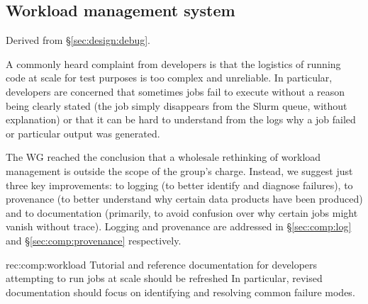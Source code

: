 \subsection{Workload management system}
\label{sec:comp:workload}

Derived from \S\ref{sec:design:debug}.

A commonly heard complaint from developers is that the logistics of running code at scale for test purposes is too complex and unreliable.
In particular, developers are concerned that sometimes jobs fail to execute without a reason being clearly stated (the job simply disappears from the Slurm queue, without explanation) or that it can be hard to understand from the logs why a job failed or particular output was generated.

The WG reached the conclusion that a wholesale rethinking of workload management is outside the scope of the group's charge.
Instead, we suggest just three key improvements: to logging (to better identify and diagnose failures), to provenance (to better understand why certain data products have been produced) and to documentation (primarily, to avoid confusion over why certain jobs might vanish without trace). Logging and provenance are addressed in \S\ref{sec:comp:log} and \S\ref{sec:comp:provenance} respectively.

\begin{recommendation}
  {rec:comp:workload}
  {Tutorial and reference documentation for developers attempting to run jobs at scale should be refreshed}
  In particular, revised documentation should focus on identifying and resolving common failure modes.
\end{recommendation}
